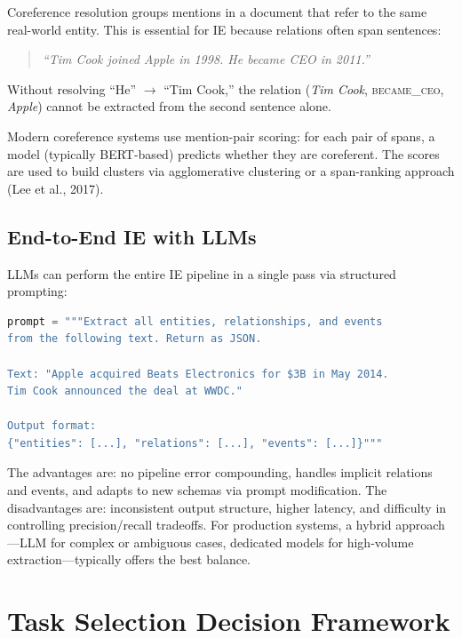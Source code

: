 Coreference resolution groups mentions in a document that refer to the same real-world entity.
This is essential for IE because relations often span sentences:

\begin{quote}
\emph{``Tim Cook joined Apple in 1998.  He became CEO in 2011.''}
\end{quote}

Without resolving ``He'' $\to$ ``Tim Cook,'' the relation (\textit{Tim Cook},
\textsc{became\_ceo}, \textit{Apple}) cannot be extracted from the second sentence alone.

Modern coreference systems use mention-pair scoring: for each pair of spans, a model (typically
BERT-based) predicts whether they are coreferent.  The scores are used to build clusters via
agglomerative clustering or a span-ranking approach (Lee et al., 2017).

\subsection{End-to-End IE with LLMs}

LLMs can perform the entire IE pipeline in a single pass via structured prompting:

\begin{lstlisting}[language=Python, caption={LLM-based end-to-end information extraction.}]
prompt = """Extract all entities, relationships, and events
from the following text. Return as JSON.

Text: "Apple acquired Beats Electronics for $3B in May 2014.
Tim Cook announced the deal at WWDC."

Output format:
{"entities": [...], "relations": [...], "events": [...]}"""
\end{lstlisting}

The advantages are: no pipeline error compounding, handles implicit relations and events, and
adapts to new schemas via prompt modification.  The disadvantages are: inconsistent output
structure, higher latency, and difficulty in controlling precision/recall tradeoffs.  For
production systems, a hybrid approach---LLM for complex or ambiguous cases, dedicated models
for high-volume extraction---typically offers the best balance.

\section{Task Selection Decision Framework}
\label{sec:task_decision_framework}

